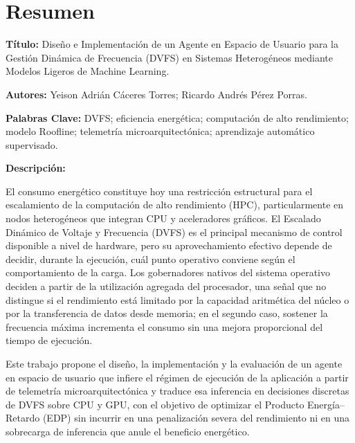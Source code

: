 \documentclass[12pt,oneside,spanish]{book}
\begin{document}
\vspace{1cm}



\chapter*{Resumen}

\vspace{1cm}

\noindent\textbf{Título:} Diseño e Implementación de un Agente en Espacio de Usuario para la Gestión Dinámica de Frecuencia (DVFS) en Sistemas Heterogéneos mediante Modelos Ligeros de Machine Learning.

\medskip

\noindent\textbf{Autores:} Yeison Adrián Cáceres Torres; Ricardo Andrés Pérez Porras.

\medskip

\noindent\textbf{Palabras Clave:} DVFS; eficiencia energética; computación de alto rendimiento; modelo Roofline; telemetría microarquitectónica; aprendizaje automático supervisado.

\vspace{0.5cm}

\noindent\textbf{Descripción:}

El consumo energético constituye hoy una restricción estructural para el escalamiento de la computación de alto rendimiento (HPC), particularmente en nodos heterogéneos que integran CPU y aceleradores gráficos. El Escalado Dinámico de Voltaje y Frecuencia (DVFS) es el principal mecanismo de control disponible a nivel de hardware, pero su aprovechamiento efectivo depende de decidir, durante la ejecución, cuál punto operativo conviene según el comportamiento de la carga. Los gobernadores nativos del sistema operativo deciden a partir de la utilización agregada del procesador, una señal que no distingue si el rendimiento está limitado por la capacidad aritmética del núcleo o por la transferencia de datos desde memoria; en el segundo caso, sostener la frecuencia máxima incrementa el consumo sin una mejora proporcional del tiempo de ejecución.

Este trabajo propone el diseño, la implementación y la evaluación de un agente en espacio de usuario que infiere el régimen de ejecución de la aplicación a partir de telemetría microarquitectónica y traduce esa inferencia en decisiones discretas de DVFS sobre CPU y GPU, con el objetivo de optimizar el Producto Energía--Retardo (EDP) sin incurrir en una penalización severa del rendimiento ni en una sobrecarga de inferencia que anule el beneficio energético.
\end{document}
